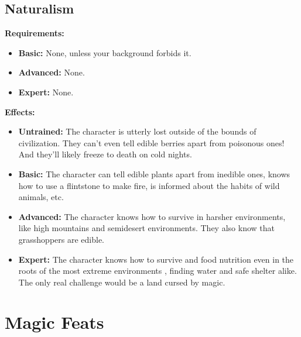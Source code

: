 \documentclass[openany,10pt,a4paper]{book}
\begin{document}
\begin{itemize}
\begin{itemize}
\begin{itemize}
\begin{itemize}
\subsection{Naturalism}
\begin{table}[!ht]
\centering
{}
\end{table}
\textbf{Requirements:}
\begin{itemize}
	\item \textbf{Basic:} None, unless your background forbids it.
	\item \textbf{Advanced:} None.
	\item \textbf{Expert:} None.
\end{itemize}
\textbf{Effects:}
\begin{itemize}
	\item \textbf{Untrained:} The character is utterly lost outside of the bounds of civilization. They can't even tell edible berries apart from poisonous ones! And they'll likely freeze to death on cold nights.
	\item \textbf{Basic:} The character can tell edible plants apart from inedible ones, knows how to use a flintstone to make fire, is informed about the habits of wild animals, etc.
	\item \textbf{Advanced:} The character knows how to survive in harsher environments, like high mountains and semidesert environments. They also know that grasshoppers are edible.
	\item \textbf{Expert:} The character knows how to survive and food nutrition even in the roots of the most extreme environments , finding water and safe shelter alike. The only real challenge would be a land cursed by magic.
\end{itemize}\newpage
\section{Magic Feats}

\end{itemize}
\end{itemize}
\end{itemize}
\end{itemize}
\end{document}
